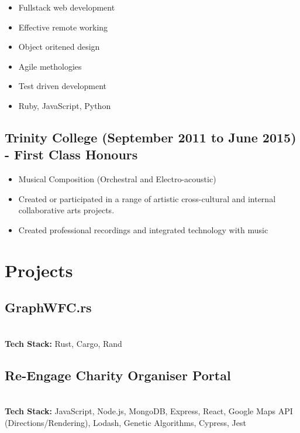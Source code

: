 \documentclass[12pt]{IEEEtran}
\begin{document}
\begin{itemize}
\item Fullstack web development
\item Effective remote working
\item Object oritened design
\item Agile methologies
\item Test driven development
\item Ruby, JavaScript, Python
\end{itemize}

\subsection*{Trinity College (September 2011 to June 2015) - First Class Honours}
\begin{itemize}
\item Musical Composition (Orchestral and Electro-acoustic)
\item Created or participated in a range of artistic cross-cultural and internal collaborative arts projects.
\item Created professional recordings and integrated technology with music
\end{itemize}

\vskip 1in

\section*{Projects}
\subsection*{GraphWFC.rs}
 \\[5pt]
\textbf{Tech Stack:} Rust, Cargo, Rand

\subsection*{Re-Engage Charity Organiser Portal}
 \\[5pt]
\textbf{Tech Stack:} JavaScript, Node.js, MongoDB, Express, React, Google Maps API (Directions/Rendering), Lodash, Genetic Algorithms, Cypress, Jest
\end{document}
